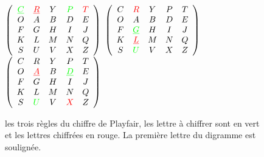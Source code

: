 \begin{figure}[h]
  $
  \left(
    \begin{array}{ccccc}
      \textcolor{green}{\underline{C}} & \textcolor{red}{\underline{R}} & Y & \textcolor{green}{P} & \textcolor{red}{T} \\
      O & A & B & D & E \\
      F & G & H & I & J \\
      K & L & M & N & Q \\
      S & U & V & X & Z
    \end{array}
  \right)
  $
  \hfill
  $
  \left(
    \begin{array}{ccccc}
      C & \textcolor{red}{R} & Y & P & T \\
      O & A & B & D & E \\
      F & \textcolor{green}{\underline{G}} & H & I & J \\
      K & \textcolor{red}{\underline{L}} & M & N & Q \\
      S & \textcolor{green}{U} & V & X & Z
    \end{array}
  \right)
  $
  \hfill
  $
  \left(
    \begin{array}{ccccc}
      C & R & Y & P & T \\
      O & \textcolor{red}{\underline{A}} & B & \textcolor{green}{\underline{D}} & E \\
      F & G & H & I & J \\
      K & L & M & N & Q \\
      S & \textcolor{green}{U} & V & \textcolor{red}{X} & Z
    \end{array}
  \right)
  $
  \caption{les trois règles du chiffre de Playfair, les lettre à
    chiffrer sont en vert et les lettres chiffrées en rouge. La
    première lettre du digramme est soulignée.}
  \label{fig:Playfair}
\end{figure}

